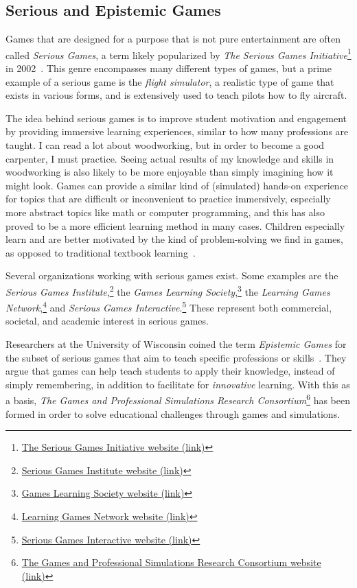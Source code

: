 \subsection{Serious and Epistemic Games}
\label{sec:serious_games}
Games that are designed for a purpose that is not pure entertainment are often called \emph{Serious Games}, a term likely popularized by \emph{The Serious Games Initiative}\footnote{\href{http://www.seriousgames.org/}{The Serious Games Initiative website (link)}} in 2002~\cite{djaouti:serious_games_origins}. This genre encompasses many different types of games, but a prime example of a serious game is the \emph{flight simulator}, a realistic type of game that exists in various forms, and is extensively used to teach pilots how to fly aircraft.

\noindent
The idea behind serious games is to improve student motivation and engagement by providing immersive learning experiences, similar to how many professions are taught. I can read a lot about woodworking, but in order to become a good carpenter, I must practice. Seeing actual results of my knowledge and skills in woodworking is also likely to be more enjoyable than simply imagining how it might look. Games can provide a similar kind of (simulated) hands-on experience for topics that are difficult or inconvenient to practice immersively, especially more abstract topics like math or computer programming, and this has also proved to be a more efficient learning method in many cases. Children especially learn and are better motivated by the kind of problem-solving we find in games, as opposed to traditional textbook learning~\cite{freitas:serious_games_new_paradigm}.

\noindent
Several organizations working with serious games exist. Some examples are the \emph{Serious Games Institute},\footnote{\href{http://www.seriousgamesinstitute.co.uk/}{Serious Games Institute website (link)}} the \emph{Games Learning Society},\footnote{\href{http://www.gameslearningsociety.org/}{Games Learning Society website (link)}} the \emph{Learning Games Network},\footnote{\href{http://learninggamesnetwork.org/}{Learning Games Network website (link)}} and \emph{Serious Games Interactive}.\footnote{\href{http://www.seriousgames.net/}{Serious Games Interactive website (link)}} These represent both commercial, societal, and academic interest in serious games.

\noindent
Researchers at the University of Wisconsin coined the term \emph{Epistemic Games} for the subset of serious games that aim to teach specific professions or skills~\cite{shaffer:epistemic_games}. They argue that games can help teach students to apply their knowledge, instead of simply remembering, in addition to facilitate for \emph{innovative} learning. With this as a basis, \emph{The Games and Professional Simulations Research Consortium}\footnote{\href{http://edgaps.org/gaps/}{The Games and Professional Simulations Research Consortium website (link)}} has been formed in order to solve educational challenges through games and simulations.

